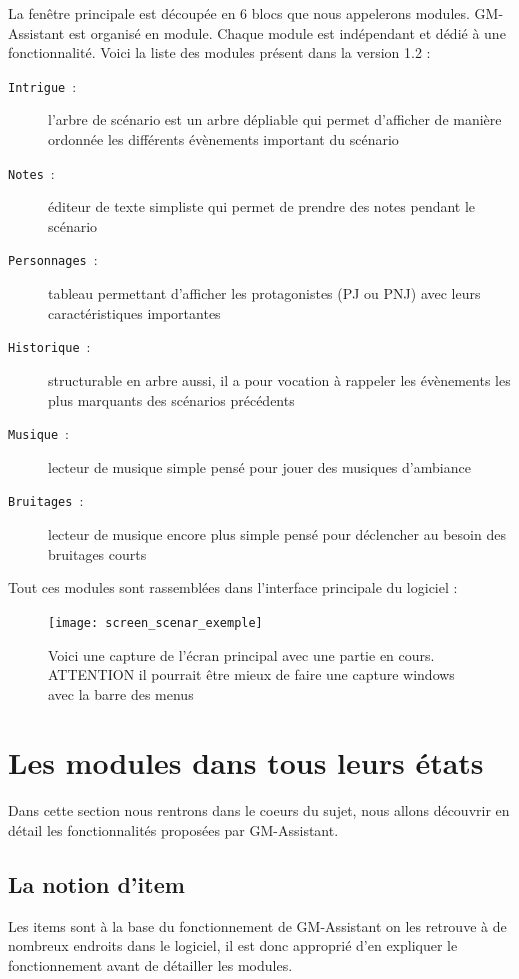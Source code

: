 \documentclass[a4paper,12pt]{article}
\newcommand*{\GMA}{GM-Assistant\xspace}
\newcommand*{\interfaceitem}[1]{\texttt{#1}}
\newcommand*{\guillemets}[1]{\og #1\fg{}\xspace}
\begin{document}
La fenêtre principale est découpée en 6 blocs que nous appelerons modules.
\GMA est organisé en module. Chaque module est indépendant et dédié à une fonctionnalité. Voici la liste des modules présent  dans la version 1.2 :
\begin{description}
    \item[\interfaceitem{Intrigue}~:]{l'arbre de scénario est un arbre \guillemets{dépliable} qui permet d'afficher de manière ordonnée les différents évènements important du scénario}
    \item[\interfaceitem{Notes}~:]{éditeur de texte simpliste qui permet de prendre des notes pendant le scénario}
    \item[\interfaceitem{Personnages}~:]{tableau permettant d'afficher les protagonistes (PJ ou PNJ) avec leurs caractéristiques importantes}
    \item[\interfaceitem{Historique}~:]{structurable en arbre aussi, il a pour vocation à rappeler les évènements les plus marquants des scénarios précédents}
    \item[\interfaceitem{Musique}~:]{lecteur de musique simple pensé pour jouer des musiques d'ambiance}
    \item[\interfaceitem{Bruitages}~:]{lecteur de musique encore plus simple pensé pour déclencher au besoin des bruitages courts}
\end{description}
Tout ces modules sont rassemblées dans l'interface principale du logiciel :
\begin{figure}[h]
    \texttt{[image: screen\_scenar\_exemple]}
    \caption{Voici une capture de l'écran principal avec une partie en cours.
    ATTENTION il pourrait être mieux de faire une capture windows avec la barre des menus}
\end{figure}

\section{Les modules dans tous leurs états}\label{details}
Dans cette section nous rentrons dans le coeurs du sujet, nous allons découvrir en détail les fonctionnalités proposées par \GMA.

\subsection{La notion d'item}\label{item}
Les items sont à la base du fonctionnement de \GMA on les retrouve à de nombreux endroits dans le logiciel, il est donc approprié d'en expliquer le fonctionnement avant de détailler les modules.
\end{document}
